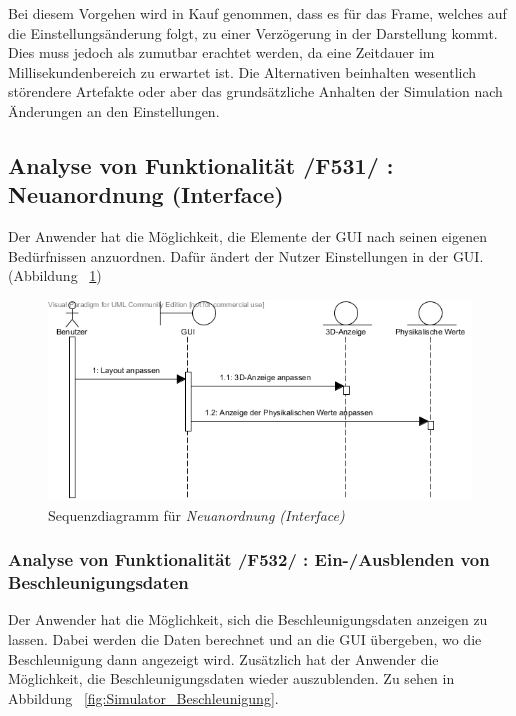Bei diesem Vorgehen wird in Kauf genommen, dass es für das Frame, welches auf die Einstellungsänderung folgt, zu einer Verzögerung in der Darstellung kommt. Dies muss jedoch als zumutbar erachtet werden, da eine Zeitdauer im Millisekundenbereich zu erwartet ist. Die Alternativen beinhalten wesentlich störendere Artefakte oder aber das grundsätzliche Anhalten der Simulation nach Änderungen an den Einstellungen.

\subsection{Analyse von Funktionalität /F531/ :   Neuanordnung (Interface)}
Der Anwender hat die Möglichkeit, die Elemente der GUI nach seinen eigenen Bedürfnissen anzuordnen. Dafür ändert der Nutzer Einstellungen in der GUI. (Abbildung ~\ref{fig:Interface_Neuanordnung})

\begin{figure}[h!]
\includegraphics[width=\linewidth]{bilder/Interface_Neuanordnung}
\caption{Sequenzdiagramm für \textit{Neuanordnung (Interface)}}
\label{fig:Interface_Neuanordnung}
\end{figure}
\subsubsection{Analyse von Funktionalität /F532/ :  Ein-/Ausblenden von Beschleunigungsdaten}
Der Anwender hat die Möglichkeit, sich die Beschleunigungsdaten anzeigen zu lassen. Dabei werden die Daten berechnet und an die GUI übergeben, wo die Beschleunigung dann angezeigt wird. Zusätzlich hat der Anwender die Möglichkeit, die Beschleunigungsdaten wieder auszublenden. Zu sehen in Abbildung ~\ref{fig:Simulator_Beschleunigung}.

